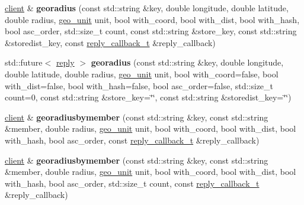 \begin{DoxyCompactItemize}
\item 
\mbox{\label{classcpp__redis_1_1client_aa9fe2141df3d4cf5727981a61fe47e13}} 
\mbox{\hyperlink{classcpp__redis_1_1client}{client}} \& {\bfseries georadius} (const std\+::string \&key, double longitude, double latitude, double radius, \mbox{\hyperlink{classcpp__redis_1_1client_aa5998536fd32ff4387c89be514997620}{geo\+\_\+unit}} unit, bool with\+\_\+coord, bool with\+\_\+dist, bool with\+\_\+hash, bool asc\+\_\+order, std\+::size\+\_\+t count, const std\+::string \&store\+\_\+key, const std\+::string \&storedist\+\_\+key, const \mbox{\hyperlink{classcpp__redis_1_1client_af7a65eb21aa25230bfbb0b0203c4fc04}{reply\+\_\+callback\+\_\+t}} \&reply\+\_\+callback)
\item 
\mbox{\label{classcpp__redis_1_1client_a0a7d62282d055a3bbf5949b077841ed8}} 
std\+::future$<$ \mbox{\hyperlink{classcpp__redis_1_1reply}{reply}} $>$ {\bfseries georadius} (const std\+::string \&key, double longitude, double latitude, double radius, \mbox{\hyperlink{classcpp__redis_1_1client_aa5998536fd32ff4387c89be514997620}{geo\+\_\+unit}} unit, bool with\+\_\+coord=false, bool with\+\_\+dist=false, bool with\+\_\+hash=false, bool asc\+\_\+order=false, std\+::size\+\_\+t count=0, const std\+::string \&store\+\_\+key=\char`\"{}\char`\"{}, const std\+::string \&storedist\+\_\+key=\char`\"{}\char`\"{})
\item 
\mbox{\label{classcpp__redis_1_1client_ad3bf74f6f3b0094311dd8d8c4dede6eb}} 
\mbox{\hyperlink{classcpp__redis_1_1client}{client}} \& {\bfseries georadiusbymember} (const std\+::string \&key, const std\+::string \&member, double radius, \mbox{\hyperlink{classcpp__redis_1_1client_aa5998536fd32ff4387c89be514997620}{geo\+\_\+unit}} unit, bool with\+\_\+coord, bool with\+\_\+dist, bool with\+\_\+hash, bool asc\+\_\+order, const \mbox{\hyperlink{classcpp__redis_1_1client_af7a65eb21aa25230bfbb0b0203c4fc04}{reply\+\_\+callback\+\_\+t}} \&reply\+\_\+callback)
\item 
\mbox{\label{classcpp__redis_1_1client_ab0e0b3210b502462f50e517e8ec1d539}} 
\mbox{\hyperlink{classcpp__redis_1_1client}{client}} \& {\bfseries georadiusbymember} (const std\+::string \&key, const std\+::string \&member, double radius, \mbox{\hyperlink{classcpp__redis_1_1client_aa5998536fd32ff4387c89be514997620}{geo\+\_\+unit}} unit, bool with\+\_\+coord, bool with\+\_\+dist, bool with\+\_\+hash, bool asc\+\_\+order, std\+::size\+\_\+t count, const \mbox{\hyperlink{classcpp__redis_1_1client_af7a65eb21aa25230bfbb0b0203c4fc04}{reply\+\_\+callback\+\_\+t}} \&reply\+\_\+callback)

\end{DoxyCompactItemize}
